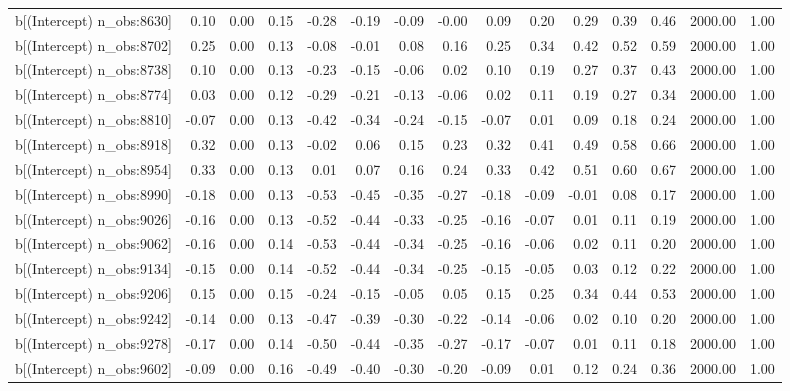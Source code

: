 \begin{table}[ht]
\begin{tabular}{rrrrrrrrrrrrrrr}
  b[(Intercept) n\_obs:8630] & 0.10 & 0.00 & 0.15 & -0.28 & -0.19 & -0.09 & -0.00 & 0.09 & 0.20 & 0.29 & 0.39 & 0.46 & 2000.00 & 1.00 \\ 
  b[(Intercept) n\_obs:8702] & 0.25 & 0.00 & 0.13 & -0.08 & -0.01 & 0.08 & 0.16 & 0.25 & 0.34 & 0.42 & 0.52 & 0.59 & 2000.00 & 1.00 \\ 
  b[(Intercept) n\_obs:8738] & 0.10 & 0.00 & 0.13 & -0.23 & -0.15 & -0.06 & 0.02 & 0.10 & 0.19 & 0.27 & 0.37 & 0.43 & 2000.00 & 1.00 \\ 
  b[(Intercept) n\_obs:8774] & 0.03 & 0.00 & 0.12 & -0.29 & -0.21 & -0.13 & -0.06 & 0.02 & 0.11 & 0.19 & 0.27 & 0.34 & 2000.00 & 1.00 \\ 
  b[(Intercept) n\_obs:8810] & -0.07 & 0.00 & 0.13 & -0.42 & -0.34 & -0.24 & -0.15 & -0.07 & 0.01 & 0.09 & 0.18 & 0.24 & 2000.00 & 1.00 \\ 
  b[(Intercept) n\_obs:8918] & 0.32 & 0.00 & 0.13 & -0.02 & 0.06 & 0.15 & 0.23 & 0.32 & 0.41 & 0.49 & 0.58 & 0.66 & 2000.00 & 1.00 \\ 
  b[(Intercept) n\_obs:8954] & 0.33 & 0.00 & 0.13 & 0.01 & 0.07 & 0.16 & 0.24 & 0.33 & 0.42 & 0.51 & 0.60 & 0.67 & 2000.00 & 1.00 \\ 
  b[(Intercept) n\_obs:8990] & -0.18 & 0.00 & 0.13 & -0.53 & -0.45 & -0.35 & -0.27 & -0.18 & -0.09 & -0.01 & 0.08 & 0.17 & 2000.00 & 1.00 \\ 
  b[(Intercept) n\_obs:9026] & -0.16 & 0.00 & 0.13 & -0.52 & -0.44 & -0.33 & -0.25 & -0.16 & -0.07 & 0.01 & 0.11 & 0.19 & 2000.00 & 1.00 \\ 
  b[(Intercept) n\_obs:9062] & -0.16 & 0.00 & 0.14 & -0.53 & -0.44 & -0.34 & -0.25 & -0.16 & -0.06 & 0.02 & 0.11 & 0.20 & 2000.00 & 1.00 \\ 
  b[(Intercept) n\_obs:9134] & -0.15 & 0.00 & 0.14 & -0.52 & -0.44 & -0.34 & -0.25 & -0.15 & -0.05 & 0.03 & 0.12 & 0.22 & 2000.00 & 1.00 \\ 
  b[(Intercept) n\_obs:9206] & 0.15 & 0.00 & 0.15 & -0.24 & -0.15 & -0.05 & 0.05 & 0.15 & 0.25 & 0.34 & 0.44 & 0.53 & 2000.00 & 1.00 \\ 
  b[(Intercept) n\_obs:9242] & -0.14 & 0.00 & 0.13 & -0.47 & -0.39 & -0.30 & -0.22 & -0.14 & -0.06 & 0.02 & 0.10 & 0.20 & 2000.00 & 1.00 \\ 
  b[(Intercept) n\_obs:9278] & -0.17 & 0.00 & 0.14 & -0.50 & -0.44 & -0.35 & -0.27 & -0.17 & -0.07 & 0.01 & 0.11 & 0.18 & 2000.00 & 1.00 \\ 
  b[(Intercept) n\_obs:9602] & -0.09 & 0.00 & 0.16 & -0.49 & -0.40 & -0.30 & -0.20 & -0.09 & 0.01 & 0.12 & 0.24 & 0.36 & 2000.00 & 1.00 \\ 

\end{tabular}
\end{table}
